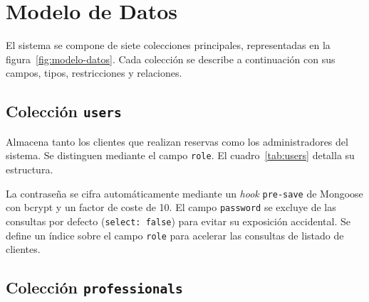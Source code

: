 \section{Modelo de Datos}\label{sec:modelo-datos}

El sistema se compone de siete colecciones principales, representadas en la figura~\ref{fig:modelo-datos}. Cada colecci\'on se describe a continuaci\'on con sus campos, tipos, restricciones y relaciones.


\subsection{Colecci\'on \texttt{users}}\label{subsec:users}

Almacena tanto los clientes que realizan reservas como los administradores del sistema. Se distinguen mediante el campo \texttt{role}. El cuadro~\ref{tab:users} detalla su estructura.


La contrase\~na se cifra autom\'aticamente mediante un \textit{hook} \texttt{pre-save} de Mongoose con bcrypt y un factor de coste de 10. El campo \texttt{password} se excluye de las consultas por defecto (\texttt{select: false}) para evitar su exposici\'on accidental. Se define un \'indice sobre el campo \texttt{role} para acelerar las consultas de listado de clientes.

\subsection{Colecci\'on \texttt{professionals}}\label{subsec:professionals}

